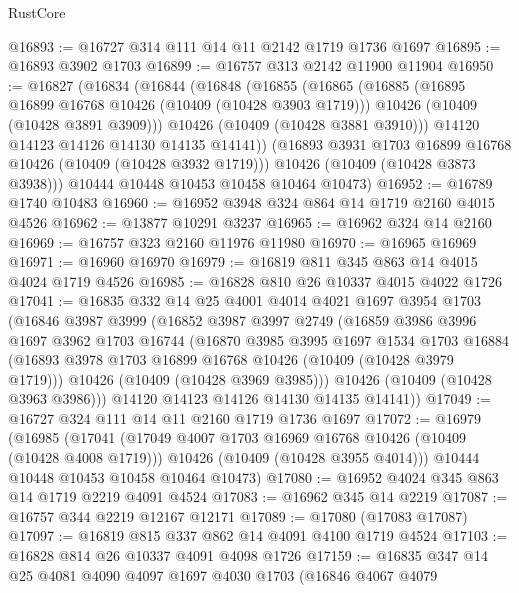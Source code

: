 \begin{lexlean}{RustCore}
\begin{coremodule}
@16893 := @16727 @314 @111 @14 @11 @2142 @1719 @1736 @1697
@16895 := @16893 @3902 @1703
@16899 := @16757 @313 @2142 @11900 @11904
@16950 := @16827
    (@16834
      (@16844
        (@16848
          (@16855
            (@16865
              (@16885
                (@16895 @16899 @16768 @10426 (@10409 (@10428 @3903 @1719)))
                @10426
                (@10409 (@10428 @3891 @3909)))
              @10426
              (@10409 (@10428 @3881 @3910)))
            @14120
            @14123
            @14126
            @14130
            @14135
            @14141))
        (@16893 @3931 @1703 @16899 @16768 @10426 (@10409 (@10428 @3932 @1719)))
        @10426
        (@10409 (@10428 @3873 @3938)))
      @10444
      @10448
      @10453
      @10458
      @10464
      @10473)
@16952 := @16789 @1740 @10483
@16960 := @16952 @3948 @324 @864 @14 @1719 @2160 @4015 @4526
@16962 := @13877 @10291 @3237
@16965 := @16962 @324 @14 @2160
@16969 := @16757 @323 @2160 @11976 @11980
@16970 := @16965 @16969
@16971 := @16960 @16970
@16979 := @16819 @811 @345 @863 @14 @4015 @4024 @1719 @4526
@16985 := @16828 @810 @26 @10337 @4015 @4022 @1726
@17041 := @16835
    @332
    @14
    @25
    @4001
    @4014
    @4021
    @1697
    @3954
    @1703
    (@16846
      @3987
      @3999
      (@16852
        @3987
        @3997
        @2749
        (@16859
          @3986
          @3996
          @1697
          @3962
          @1703
          @16744
          (@16870
            @3985
            @3995
            @1697
            @1534
            @1703
            @16884
            (@16893 @3978 @1703 @16899 @16768 @10426 (@10409 (@10428 @3979 @1719)))
            @10426
            (@10409 (@10428 @3969 @3985)))
          @10426
          (@10409 (@10428 @3963 @3986)))
        @14120
        @14123
        @14126
        @14130
        @14135
        @14141))
@17049 := @16727 @324 @111 @14 @11 @2160 @1719 @1736 @1697
@17072 := @16979
    (@16985
      (@17041
        (@17049 @4007 @1703 @16969 @16768 @10426 (@10409 (@10428 @4008 @1719)))
        @10426
        (@10409 (@10428 @3955 @4014)))
      @10444
      @10448
      @10453
      @10458
      @10464
      @10473)
@17080 := @16952 @4024 @345 @863 @14 @1719 @2219 @4091 @4524
@17083 := @16962 @345 @14 @2219
@17087 := @16757 @344 @2219 @12167 @12171
@17089 := @17080 (@17083 @17087)
@17097 := @16819 @815 @337 @862 @14 @4091 @4100 @1719 @4524
@17103 := @16828 @814 @26 @10337 @4091 @4098 @1726
@17159 := @16835
    @347
    @14
    @25
    @4081
    @4090
    @4097
    @1697
    @4030
    @1703
    (@16846
      @4067
      @4079

\end{coremodule}
\end{lexlean}
